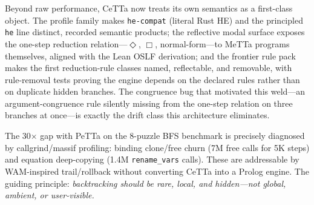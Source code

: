 \documentclass[11pt]{article}
\newcommand{\code}[1]{\texttt{#1}}
\newcommand{\PeTTa}{\textup{PeTTa}}
\newcommand{\HE}{\textup{HE}}
\newcommand{\CeTTa}{\textup{CeTTa}}
\begin{document}
Beyond raw performance, \CeTTa{} now treats its own semantics as a
first-class object.  The profile family makes \code{he-compat} (literal
Rust \HE{}) and the principled \code{he} line distinct, recorded
semantic products; the reflective modal surface exposes the one-step
reduction relation---$\Diamond$, $\Box$, normal-form---to MeTTa
programs themselves, aligned with the Lean OSLF derivation; and the
frontier rule pack makes the first reduction-rule classes named,
reflectable, and removable, with rule-removal tests proving the engine
depends on the declared rules rather than on duplicate hidden branches.
The congruence bug that motivated this weld---an argument-congruence
rule silently missing from the one-step relation on three branches at
once---is exactly the drift class this architecture eliminates.

The 30$\times$ gap with \PeTTa{} on the 8-puzzle BFS benchmark
is precisely diagnosed by callgrind/massif profiling: binding
clone/free churn (7M free calls for 5K steps) and equation
deep-copying (1.4M \code{rename\_vars} calls).  These are
addressable by WAM-inspired trail/rollback without converting
\CeTTa{} into a Prolog engine.  The guiding principle:
\emph{backtracking should be rare, local, and hidden---not global,
ambient, or user-visible.}
\end{document}
